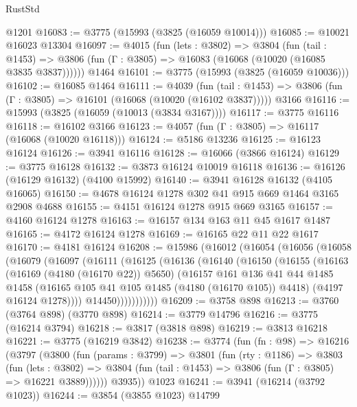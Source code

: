 \begin{lexlean}{RustStd}
\begin{coremodule}
    @1201
@16083 := @3775 (@15993 (@3825 (@16059 @10014)))
@16085 := @10021 @16023 @13304
@16097 := @4015
    (fun (lets : @3802) =>
    @3804
      (fun (tail : @1453) =>
      @3806 (fun (Γ : @3805) => @16083 (@16068 (@10020 (@16085 @3835 @3837))))))
    @1464
@16101 := @3775 (@15993 (@3825 (@16059 @10036)))
@16102 := @16085 @1464
@16111 := @4039
    (fun (tail : @1453) => @3806 (fun (Γ : @3805) => @16101 (@16068 (@10020 (@16102 @3837)))))
    @3166
@16116 := @15993 (@3825 (@16059 (@10013 (@3834 @3167))))
@16117 := @3775 @16116
@16118 := @16102 @3166
@16123 := @4057 (fun (Γ : @3805) => @16117 (@16068 (@10020 @16118)))
@16124 := @5186 @13236
@16125 := @16123 @16124
@16126 := @3941 @16116
@16128 := @16066 (@3866 @16124)
@16129 := @3775 @16128
@16132 := @3873 @16124 @10019 @16118
@16136 := @16126 (@16129 @16132) (@4100 @15992)
@16140 := @3941 @16128 @16132 (@4105 @16065)
@16150 := @4678 @16124 @1278 @302 @41 @915 @669 @1464 @3165 @2908 @4688
@16155 := @4151 @16124 @1278 @915 @669 @3165
@16157 := @4160 @16124 @1278
@16163 := @16157 @134 @163 @11 @45 @1617 @1487
@16165 := @4172 @16124 @1278
@16169 := @16165 @22 @11 @22 @1617
@16170 := @4181 @16124
@16208 := @15986
    (@16012
      (@16054
        (@16056
          (@16058
            (@16079
              (@16097
                (@16111
                  (@16125
                    (@16136
                      (@16140
                        (@16150
                          (@16155
                            (@16163
                              (@16169 (@4180 (@16170 @22)) @5650)
                              (@16157
                                @161
                                @136
                                @41
                                @44
                                @1485
                                @1458
                                (@16165 @105 @41 @105 @1485 (@4180 (@16170 @105)) @4418)
                                (@4197 @16124 @1278))))
                          @14450)))))))))))
@16209 := @3758 @898
@16213 := @3760 (@3764 @898) (@3770 @898)
@16214 := @3779 @14796
@16216 := @3775 (@16214 @3794)
@16218 := @3817 (@3818 @898)
@16219 := @3813 @16218
@16221 := @3775 (@16219 @3842)
@16238 := @3774
    (fun (fn : @98) =>
    @16216
      (@3797
        (@3800
          (fun (params : @3799) =>
          @3801
            (fun (rty : @1186) =>
            @3803
              (fun (lets : @3802) =>
              @3804 (fun (tail : @1453) => @3806 (fun (Γ : @3805) => @16221 @3889))))))
        @3935))
    @1023
@16241 := @3941 (@16214 (@3792 @1023))
@16244 := @3854 (@3855 @1023) @14799

\end{coremodule}
\end{lexlean}
